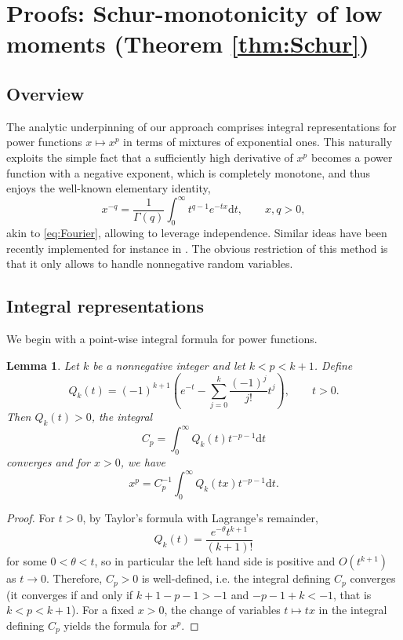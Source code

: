 \documentclass[10pt]{article}
\newcommand{\dd}{\mathrm{d}}
\newcommand{\1}{\textbf{1}}
\newtheorem{lemma}[theorem]{Lemma}
\theoremstyle{remark}
\theoremstyle{definition}
\begin{document}
\section{Proofs: Schur-monotonicity of low moments (Theorem \ref{thm:Schur})}\label{sec:proof-Schur}


\subsection{Overview}
The analytic underpinning of our approach comprises integral representations for power functions $x \mapsto x^p$ in terms of mixtures of exponential ones. This naturally exploits the simple fact that a sufficiently high derivative of $x^p$ becomes a power function with a negative exponent, which is completely monotone, and thus enjoys the well-known elementary identity,
\[ 
x^{-q} = \frac{1}{\Gamma(q)}\int_0^\infty t^{q-1}e^{-tx} \dd t, \qquad x, q > 0,
 \]
akin to \eqref{eq:Fourier}, allowing to leverage independence. Similar ideas have been recently implemented for instance in \cite{CST0, LamT}. The obvious restriction of this method is that it only allows to handle nonnegative random variables. 


\subsection{Integral representations}


We begin with a point-wise integral formula for power functions.

\begin{lemma}\label{lm:Q_k}
Let $k$ be a nonnegative integer and let $k < p < k+1$. Define
\[
Q_k(t) = (-1)^{k+1}\left(e^{-t} - \sum_{j=0}^k \frac{(-1)^j}{j!}t^j\right), \qquad t > 0.
\]
Then $Q_k(t) > 0$, the integral
\[
C_p = \int_0^\infty Q_k(t)t^{-p-1}\dd t
\]
converges and for $x > 0$, we have
\[
x^p = C_p^{-1}\int_0^\infty Q_k(tx)t^{-p-1}\dd t.
\]
\end{lemma}
\begin{proof}
For $t > 0$, by Taylor's formula with Lagrange's remainder,
\[
Q_k(t) = \frac{e^{-\theta}t^{k+1}}{(k+1)!}
\]
for some $0 < \theta < t$, so in particular the left hand side is positive and $O(t^{k+1})$ as $t \to 0$. Therefore, $C_p > 0$ is well-defined, i.e. the integral defining $C_p$ converges (it converges if and only if $k+1 - p - 1 > -1$ and $-p-1+k < -1$, that is $k < p < k+1$). For a fixed $x > 0$, the change of variables $t \mapsto tx$ in the integral defining $C_p$ yields the formula for $x^p$.
\end{proof}
\end{document}
